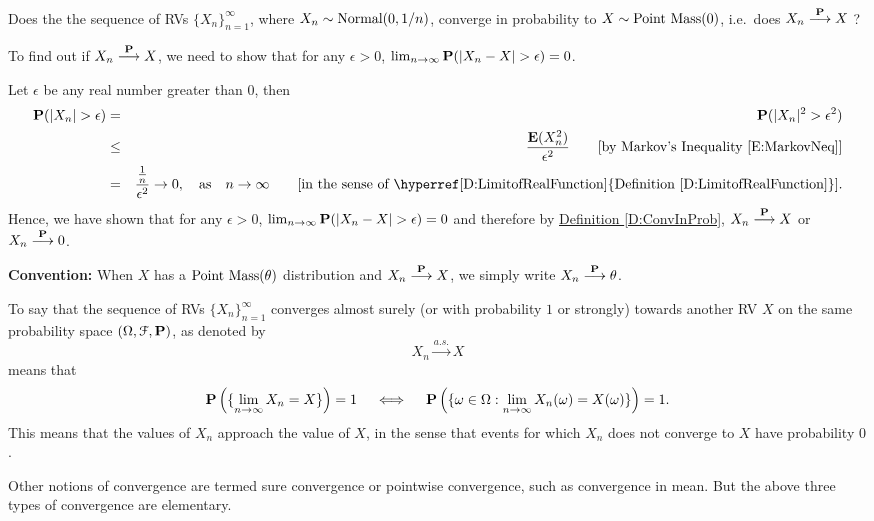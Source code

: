\begin{example}\label{EX:Normal01bynConvinProbToPointMass0}
Does the the sequence of RVs $\{X_n\}_{n=1}^{\infty}$, where $X_n \sim \mbox{{\rm Normal}}(0,1/n)$, converge in probability to $X \sim \mbox{{\rm Point~Mass}}(0)$, i.e.~does $X_n \overset{\mathbf{P}}{\longrightarrow} X$ ?

To find out if $X_n \overset{\mathbf{P}}{\longrightarrow} X$, we need to show that for any $\epsilon >0$, $\lim_{n \to \infty} \p(|X_n-X|>\epsilon)=0$.

Let $\epsilon$ be any real number greater than $0$, then
\begin{eqnarray}
\p(|X_n|>\epsilon) &=& \p(|X_n|^2 > \epsilon^2) \notag \\
&\leq& \frac{\e(X_n^2)}{\epsilon^2} \qquad \text{[by Markov's Inequality \eqref{E:MarkovNeq}]} \notag \\
&=& \frac{\frac{1}{n}}{\epsilon^2} \to 0, \quad \text{as} \quad n \to \infty \qquad \text{[in the sense of \hyperref[D:LimitofRealFunction]{Definition \ref*{D:LimitofRealFunction}}].} \notag
\end{eqnarray}
Hence, we have shown that for any $\epsilon >0$, $\lim_{n \to \infty} \p(|X_n-X|>\epsilon)=0$ and therefore by \hyperref[D:ConvInProb]{Definition \ref*{D:ConvInProb}}, $X_n \overset{\mathbf{P}}{\longrightarrow} X$ or $X_n \overset{\mathbf{P}}{\longrightarrow} 0$.  

{\normalsize
{\bf Convention:} When $X$ has a $\mbox{{\rm Point~Mass}}(\theta)$ distribution and $X_n \overset{\mathbf{P}}{\longrightarrow} X$, we simply write $X_n \overset{\mathbf{P}}{\longrightarrow} \theta$.
}
\end{example}

\begin{definition}
To say that the sequence of RVs $\{X_n\}_{n=1}^{\infty}$ converges almost surely (or with probability $1$ or strongly) towards another RV $X$ on the same probability space $(\Omega,\mathcal{F},\mathbf{P})$, as denoted by
\[
X_n \overset{a.s.}{\to} X
\]
means that
\[
\mathbf{P} \left( \{ \lim_{n \to \infty} X_n = X \} \right) = 1 \quad \iff \quad \mathbf{P} \left( \{\omega \in \Omega : \lim_{n \to \infty} X_n(\omega) = X(\omega)\} \right) = 1.
\]
This means that the values of $X_n$ approach the value of $X$, in the sense that events for which $X_n$ does not converge to $X$ have probability $0$.
\end{definition}

Other notions of convergence are termed sure convergence or pointwise convergence, such as convergence in mean. 
But the above three types of convergence are elementary. %

